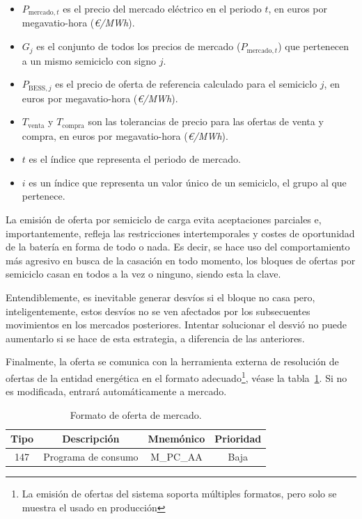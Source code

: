 \begin{itemize}
  \item \( P_{\text{mercado}, t} \) es el precio del mercado eléctrico en el periodo \( t \), en euros por megavatio-hora (\textit{€/MWh}).

  \item \( G_{j} \) es el conjunto de todos los precios de mercado (\( P_{\text{mercado}, t} \)) que pertenecen a un mismo semiciclo con signo \( j \).

  \item \( P_{\text{BESS}, j} \) es el precio de oferta de referencia calculado para el semiciclo \( j \), en euros por megavatio-hora (\textit{€/MWh}).

  \item \( T_{\text{venta}} \) y \( T_{\text{compra}} \) son las tolerancias de precio para las ofertas de venta y compra, en euros por megavatio-hora (\textit{€/MWh}).

  \item \( t \) es el índice que representa el periodo de mercado.

  \item \( i \) es un índice que representa un valor único de un semiciclo, el grupo al que pertenece.

\end{itemize}

La emisión de oferta por semiciclo de carga evita aceptaciones parciales e, importantemente, refleja las restricciones intertemporales y costes de oportunidad de la batería en forma de todo o nada. Es decir, se hace uso del comportamiento más agresivo en busca de la casación en todo momento, los bloques de ofertas por semiciclo casan en todos a la vez o ninguno, siendo esta la clave.

Entendiblemente, es inevitable generar desvíos si el bloque no casa pero, inteligentemente, estos desvíos no se ven afectados por los subsecuentes movimientos en los mercados posteriores. Intentar solucionar el desvió no puede aumentarlo si se hace de esta estrategia, a diferencia de las anteriores.

Finalmente, la oferta se comunica con la herramienta externa de resolución de ofertas de la entidad energética en el formato adecuado\footnote{La emisión de ofertas del sistema soporta múltiples formatos, pero solo se muestra el usado en producción}, véase la tabla~\ref{tab:formato-oferta}. Si no es modificada, entrará automáticamente a mercado.


\begin{table}[ht]
  \centering
  \begin{tabular}{|c|c|c|c|}
    \hline
    Tipo & Descripción         & Mnemónico & Prioridad\\
    \hline
    147  & Programa de consumo & M\_PC\_AA & Baja     \\
    \hline
  \end{tabular}
  \caption{Formato de oferta de mercado.}
  \label{tab:formato-oferta}
\end{table}

